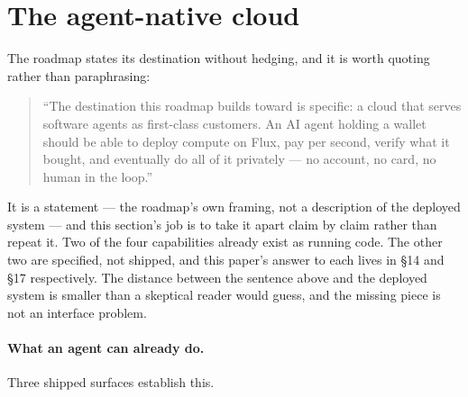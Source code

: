 \section{The agent-native cloud}\label{sec:agent-native}\label{sec:agent-native-cloud}

The roadmap states its destination without hedging, and it is worth quoting rather than
paraphrasing:
\begin{quote}
``The destination this roadmap builds toward is specific: a cloud that serves software agents
as first-class customers. An AI agent holding a wallet should be able to deploy compute on
Flux, pay per second, verify what it bought, and eventually do all of it privately --- no
account, no card, no human in the loop.'' 
\end{quote}
 It is a
\vision statement --- the roadmap's own framing, not a description of the deployed system --- and
this section's job is to take it apart claim by claim rather than repeat it. Two of the four
capabilities already exist as running code. The other two are specified, not shipped, and this
paper's answer to each lives in \S14 and \S17 respectively. The distance between the sentence
above and the deployed system is smaller than a skeptical reader would guess, and the missing
piece is not an interface problem.

\paragraph{What an agent can already do.}  Three shipped surfaces establish this.

